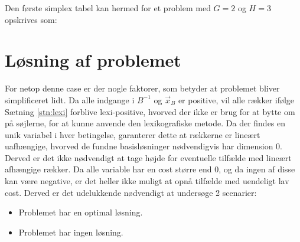 Den første simplex tabel kan hermed for et problem med $G=2$ og $H=3$ opskrives som:\\



\section{Løsning af problemet}
For netop denne case er der nogle faktorer, som betyder at problemet bliver simplificeret lidt.
Da alle indgange i $B^{-1}$ og $\vec{x}_B$ er positive, vil alle rækker ifølge Sætning \ref{stn:lexi} forblive lexi-positive, hvorved der ikke er brug for at bytte om på søjlerne, for at kunne anvende den lexikografiske metode.
Da der findes en unik variabel i hver betingelse, garanterer dette at rækkerne er lineært uafhængige, hvorved de fundne basisløsninger nødvendigvis har dimension 0. Derved er det ikke nødvendigt at tage højde for eventuelle tilfælde med lineært afhængige rækker. Da alle variable har en cost større end 0, og da ingen af disse kan være negative, er det heller ikke muligt at opnå tilfælde med uendeligt lav cost. Derved er det udelukkende nødvendigt at undersøge 2 scenarier: 
\begin{itemize}
\item Problemet har en optimal løsning.
\item Problemet har ingen løsning.
\end{itemize}


